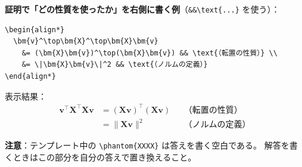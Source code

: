 \documentclass[a4paper,dvipdfmx]{jsarticle}
\newcommand{\提出期限}{2026年10月26日（月）}
\newcommand{\学籍番号}{0000000}
\newcommand{\氏名}{氏名を書く}
\newcommand{\提出日}{2026年10月26日}
\begin{document}
\noindent
\textbf{証明で「どの性質を使ったか」を右側に書く例}（\verb|&&\text{...}| を使う）：
\begin{verbatim}
\begin{align*}
  \bm{v}^\top\bm{X}^\top\bm{X}\bm{v}
    &= (\bm{X}\bm{v})^\top(\bm{X}\bm{v}) && \text{（転置の性質）} \\
    &= \|\bm{X}\bm{v}\|^2 && \text{（ノルムの定義）}
\end{align*}
\end{verbatim}
表示結果：
\begin{align*}
  \bm{v}^\top\bm{X}^\top\bm{X}\bm{v}
    &= (\bm{X}\bm{v})^\top(\bm{X}\bm{v}) && \text{（転置の性質）} \\
    &= \|\bm{X}\bm{v}\|^2 && \text{（ノルムの定義）}
\end{align*}

\noindent
\textbf{注意}：テンプレート中の \verb|\phantom{XXXX}| は答えを書く空白である。
解答を書くときはこの部分を自分の答えで置き換えること。
\end{document}
